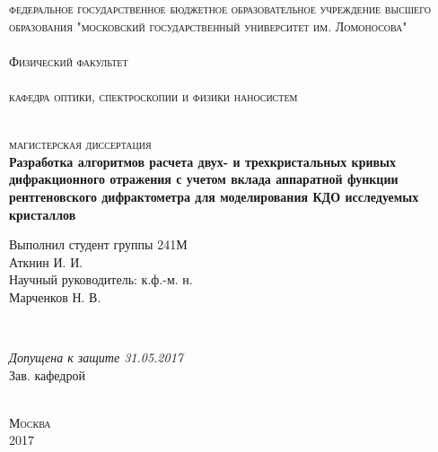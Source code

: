 \begin{titlepage}
  \begin{center}
    \textsc{\small \large федеральное государственное бюджетное образовательное
    учреждение высшего образования "московский государственный университет им. Ломоносова"}\\
    \textsc{\large \\Физический факультет}\\
    \textsc{\large \\кафедра оптики, спектроскопии и физики наносистем}\\[0.5cm]

    \begin{minipage}{\textwidth}
      \begin{flushleft}

      \end{flushleft}
    \end{minipage}\\[0.5cm]

    \textsc{\large  магистерская диссертация}\\[0.5cm]
    \textbf{\large Разработка алгоритмов расчета двух- и трехкристальных кривых дифракционного отражения с учетом вклада аппаратной функции рентгеновского дифрактометра для моделирования КДО исследуемых кристаллов}\\[2cm]


    \begin{minipage}{\textwidth}
      \begin{flushright}
        Выполнил студент группы 241М \\
        Аткнин И. И.\underline{\hspace*{4.6cm}}\\[0.5cm]
        Научный руководитель: к.ф.-м. н.\\
        Марченков Н. В. \underline{\hspace*{3.7cm}}

      \end{flushright}
    \end{minipage}\\[1.5cm]

    \begin{minipage}{\textwidth}
      \begin{flushleft}
        \textit{Допущена к защите 31.05.2017}\\
        Зав. кафедрой \underline{\hspace*{4.5cm}}\\
      \end{flushleft}
    \end{minipage}\\[1.5cm]

    \vfill
    \textsc{\small Москва\\ 2017}
  \end{center}
\end{titlepage}
